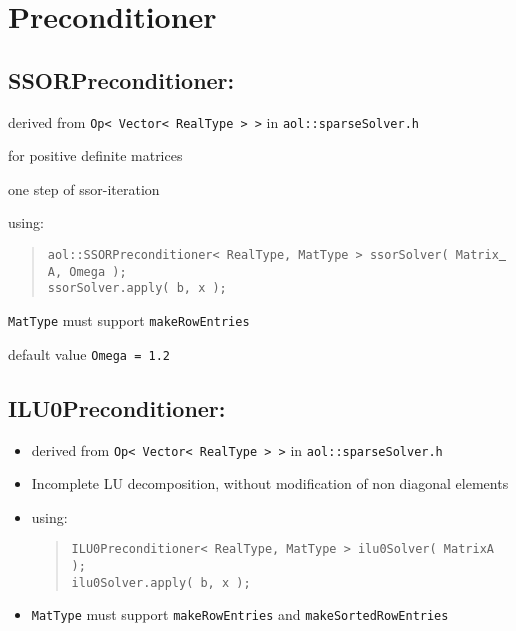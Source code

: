 
\chapter {Preconditioner}
\section{SSORPreconditioner: }
\begin{itemize}
\item derived from \texttt{Op< Vector< RealType > >} in \texttt{aol::sparseSolver.h}
\item for positive definite matrices
\item one step of ssor-iteration
\item using: \begin{quote}
\item \texttt{aol::SSORPreconditioner< RealType, MatType > ssorSolver( Matrix\underline{ }A, Omega );\\
ssorSolver.apply( b, x );}
\end{quote}
\item \texttt{MatType} must support \texttt{makeRowEntries }
\item default value \texttt{Omega = 1.2}
\end{itemize}



\section{ILU0Preconditioner: }
\begin{itemize}
\item derived from \texttt{Op< Vector< RealType > >} in \texttt{aol::sparseSolver.h}
\item Incomplete LU decomposition, without modification of non diagonal elements
\item using: \begin{quote}
\texttt{ILU0Preconditioner< RealType, MatType > ilu0Solver( MatrixA ); \\
ilu0Solver.apply( b, x );} \end{quote}
\item \texttt{MatType} must support \texttt{makeRowEntries} and \texttt{makeSortedRowEntries}
\end{itemize}

